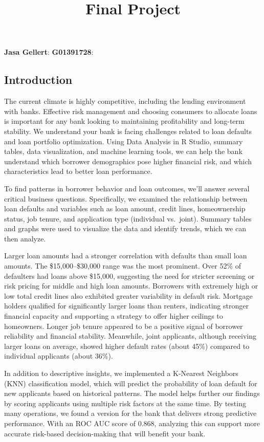 \documentclass[
]{article}
\title{Final Project}
\author{}
\date{\vspace{-2.5em}}
\begin{document}
\maketitle

\textbf{Jasa Gellert}: \textbf{G01391728}:

\subsection{Introduction}\label{introduction}

The current climate is highly competitive, including the lending
environment with banks. Effective risk management and choosing consumers
to allocate loans is important for any bank looking to maintaining
profitability and long-term stability. We understand your bank is facing
challenges related to loan defaults and loan portfolio optimization.
Using Data Analysis in R Studio, summary tables, data visualization, and
machine learning tools, we can help the bank understand which borrower
demographics pose higher financial risk, and which characteristics lead
to better loan performance.

To find patterns in borrower behavior and loan outcomes, we'll answer
several critical business questions. Specifically, we examined the
relationship between loan defaults and variables such as loan amount,
credit lines, homeownership status, job tenure, and application type
(individual vs.~joint). Summary tables and graphs were used to visualize
the data and identify trends, which we can then analyze.

Larger loan amounts had a stronger correlation with defaults than small
loan amounts. The \$15,000--\$30,000 range was the most prominent. Over
52\% of defaulters had loans above \$15,000, suggesting the need for
stricter screening or risk pricing for middle and high loan amounts.
Borrowers with extremely high or low total credit lines also exhibited
greater variability in default risk. Mortgage holders qualified for
significantly larger loans than renters, indicating stronger financial
capacity and supporting a strategy to offer higher ceilings to
homeowners. Longer job tenure appeared to be a positive signal of
borrower reliability and financial stability. Meanwhile, joint
applicants, although receiving larger loans on average, showed higher
default rates (about 45\%) compared to individual applicants (about
36\%).

In addition to descriptive insights, we implemented a K-Nearest
Neighbors (KNN) classification model, which will predict the probability
of loan default for new applicants based on historical patterns. The
model helps further our findings by scoring applicants using multiple
risk factors at the same time. By testing many operations, we found a
version for the bank that delivers strong predictive performance. With
an ROC AUC score of 0.868, analyzing this can support more accurate
risk-based decision-making that will benefit your bank.
\end{document}
